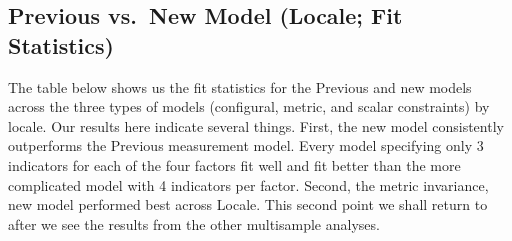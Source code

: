 \documentclass[
  letterpaper,
  DIV=11,
  numbers=noendperiod]{scrartcl}
\begin{document}
\subsection{Previous vs.~New Model (Locale; Fit
Statistics)}\label{previous-vs.-new-model-locale-fit-statistics}

The table below shows us the fit statistics for the Previous and new
models across the three types of models (configural, metric, and scalar
constraints) by locale. Our results here indicate several things. First,
the new model consistently outperforms the Previous measurement model.
Every model specifying only 3 indicators for each of the four factors
fit well and fit better than the more complicated model with 4
indicators per factor. Second, the metric invariance, new model
performed best across Locale. This second point we shall return to after
we see the results from the other multisample analyses.
\end{document}
